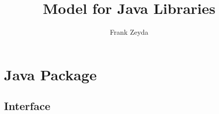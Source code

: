 \documentclass{article}
\title{{\Circus} Model for Java Libraries}
\author{Frank Zeyda}
\begin{document}
\maketitle

\tableofcontents

\newpage



\section{Java  Package}

\subsection{Interface }

\begin{circusbox}

\end{circusbox}
\end{document}

